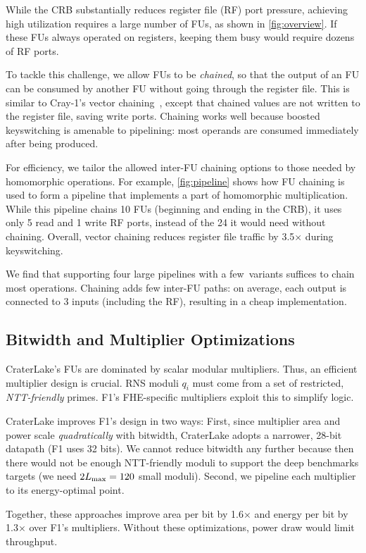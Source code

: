 \figPipeline

While the CRB substantially reduces register file (RF) port pressure, achieving
high utilization requires a large number of FUs, as shown in
\autoref{fig:overview}. If these FUs always operated on registers, keeping them
busy would require dozens of RF ports.

To tackle this challenge, we allow FUs to be \emph{chained}, so that the output
of an FU can be consumed by another FU without going through the register file.
This is similar to Cray-1's vector chaining~\cite{russell:cacm78:cray}, except
that chained values are not written to the register file, saving write ports.
Chaining works well because boosted keyswitching is amenable to pipelining:
most operands are consumed immediately after being produced.

For efficiency, we tailor the allowed inter-FU chaining options to those needed
by homomorphic operations. For example, \autoref{fig:pipeline} shows how FU
chaining is used to form a pipeline that implements a part of homomorphic
multiplication. While this pipeline chains 10 FUs (beginning and ending in the
CRB), it uses only 5 read and 1 write RF ports, instead of the 24 it would need
without chaining. Overall, vector chaining reduces register file traffic by
3.5$\times$ during keyswitching.

We find that supporting four large pipelines with a few~variants suffices to
chain most operations. Chaining adds few inter-FU paths: on average, each
output is connected to 3 inputs (including the RF), resulting in a cheap
implementation.

\subsection{Bitwidth and Multiplier Optimizations}\label{sec:bitwidth}

CraterLake's FUs are dominated by scalar modular multipliers. Thus, an
efficient multiplier design is crucial. RNS moduli $q_i$ must come from a set
of restricted, \emph{NTT-friendly} primes. F1's FHE-specific multipliers
exploit this to simplify logic.

CraterLake improves F1's design in two ways: First, since multiplier area and
power scale \emph{quadratically} with bitwidth, CraterLake adopts a narrower,
28-bit datapath (F1 uses 32 bits). We cannot reduce bitwidth any further
because then there would not be enough NTT-friendly moduli to support the deep
benchmarks \name targets (we need $2L_{\textrm{max}} = 120$ small moduli). Second, we
pipeline each multiplier to its energy-optimal point.

Together, these approaches improve area per bit by 1.6$\times$ and energy per
bit by 1.3$\times$ over F1's multipliers. Without these optimizations, power
draw would limit throughput.
